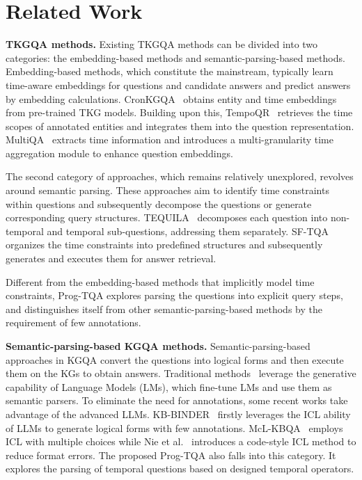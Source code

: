 \documentclass[10pt, a4paper]{article}
\begin{document}
\section{Related Work}
\textbf{TKGQA methods.} 
Existing TKGQA methods can be divided into two categories: the embedding-based methods and semantic-parsing-based methods. Embedding-based methods, which constitute the mainstream, typically learn time-aware embeddings for questions and candidate answers and predict answers by embedding calculations.  CronKGQA~\cite{saxena2021question} obtains entity and time embeddings from pre-trained TKG models. Building upon this, TempoQR~\cite{mavromatis2022tempoqr} retrieves the time scopes of annotated entities and integrates them into the question representation. MultiQA~\cite{chen2023multi} extracts time information and introduces a multi-granularity time aggregation module to enhance question embeddings.

The second category of approaches, which remains relatively unexplored, revolves around semantic parsing. These approaches aim to identify time constraints within questions and subsequently decompose the questions or generate corresponding query structures. TEQUILA~\cite{jia2018tequila}  decomposes each question into non-temporal and temporal sub-questions, addressing them separately. SF-TQA~\cite{ding2022semantic} organizes the time constraints into predefined structures and subsequently generates and executes them for answer retrieval. 

Different from the embedding-based methods that implicitly model time constraints, Prog-TQA explores parsing the questions into explicit query steps, and distinguishes itself from other semantic-parsing-based methods by the requirement of few annotations.

\textbf{Semantic-parsing-based KGQA methods.} Semantic-parsing-based approaches in KGQA convert the questions into logical forms and then execute them on the KGs to obtain answers. Traditional methods~\cite{chen2021retrack, gu2022arcaneqa, shu2022tiara} leverage the generative capability of Language Models (LMs), which fine-tune LMs and use them as semantic parsers. 
To eliminate the need for annotations, some recent works take advantage of the advanced LLMs. KB-BINDER~\cite{li2023few} firstly leverages the ICL ability of LLMs to generate logical forms with few annotations. McL-KBQA~\cite{tan2023make} employs ICL with multiple choices while Nie et al.~\cite{nie2023code} introduces a code-style ICL method to reduce format errors.
The proposed Prog-TQA also falls into this category. It explores the parsing of temporal questions based on designed temporal operators.
\end{document}
